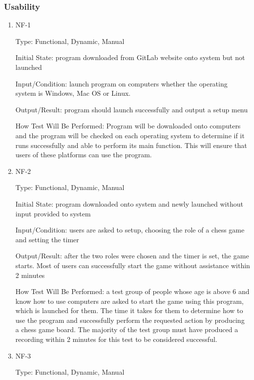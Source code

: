 \documentclass[12pt, titlepage]{article}
\begin{document}
\subsubsection{Usability}

\begin{enumerate}

\item{NF-1\\}

Type: Functional, Dynamic, Manual

Initial State: program downloaded from GitLab website onto system but not launched

Input/Condition: launch program on computers whether the operating system is Windows, Mac OS or Linux.

Output/Result: program should launch successfully and output a setup menu

How Test Will Be Performed: Program will be downloaded onto computers and the program will be checked on each operating system to determine if it runs successfully and able to perform its main function. This will ensure that users of these platforms can use the program.

\item{NF-2\\}

Type: Functional, Dynamic, Manual

Initial State: program downloaded onto system and newly launched without input provided to system

Input/Condition: users are asked to setup, choosing the role of a chess game and setting the timer 

Output/Result: after the two roles were chosen and the timer is set, the game starts. Most of users can successfully start the game without assistance within 2 minutes

How Test Will Be Performed: a test group of people whose age is above 6 and know how to use computers are asked to start the game using this program, which is launched for them. The time it takes for them to determine how to use the program and successfully perform the requested action by producing a chess game board. The majority of the test group must have produced a recording within 2 minutes for this test to be considered successful.

\item{NF-3\\}

Type: Functional, Dynamic, Manual


\end{enumerate}
\end{document}
